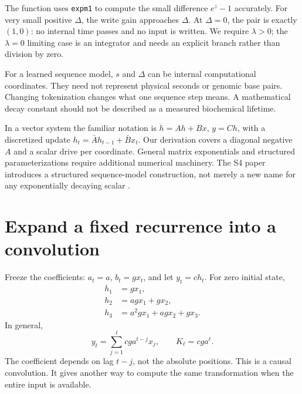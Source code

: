 The function uses \texttt{expm1} to compute the small difference
$e^z-1$ accurately. For very small positive $\Delta$, the write gain
approaches $\Delta$. At $\Delta=0$, the pair is exactly $(1,0)$:
no internal time passes and no input is written. We require $\lambda>0$;
the $\lambda=0$ limiting case is an integrator and needs an explicit
branch rather than division by zero.


For a learned sequence model, $s$ and $\Delta$ can be internal computational
coordinates. They need not represent physical seconds or genomic base pairs.
Changing tokenization changes what one sequence step means. A mathematical
decay constant should not be described as a measured biochemical lifetime.

In a vector system the familiar notation is
$\dot h=Ah+Bx$, $y=Ch$, with a discretized update
$h_t=\bar A h_{t-1}+\bar Bx_t$. Our derivation covers a diagonal negative
$A$ and a scalar drive per coordinate. General matrix exponentials and
structured parameterizations require additional numerical machinery.
The S4 paper introduces a structured sequence-model construction, not
merely a new name for any exponentially decaying scalar \cite{s4}.

\section{Expand a fixed recurrence into a convolution}

Freeze the coefficients: $a_t=a$, $b_t=gx_t$, and let $y_t=ch_t$.
For zero initial state,
\begin{align}
 h_1&=gx_1,\\
 h_2&=agx_1+gx_2,\\
 h_3&=a^2gx_1+agx_2+gx_3.
\end{align}
In general,
\begin{equation}
 y_t=\sum_{j=1}^t cga^{t-j}x_j,\qquad K_\ell=cga^\ell.
 \label{eq:convolution}
\end{equation}
The coefficient depends on lag $t-j$, not the absolute positions.
This is a causal  convolution. It gives
another way to compute the same transformation when the entire input
is available.

